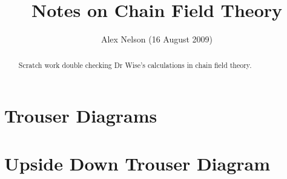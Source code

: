 \documentclass{amsart}
\title{Notes on Chain Field Theory}
\author{Alex Nelson (16 August 2009)}
\numberwithin{equation}{section}
\begin{document}
\maketitle
\begin{abstract}
Scratch work double checking Dr Wise's calculations in chain
field theory.
\end{abstract}
\section{Trouser Diagrams}

\section{Upside Down Trouser Diagram}

\nocite{*}


\end{document}
